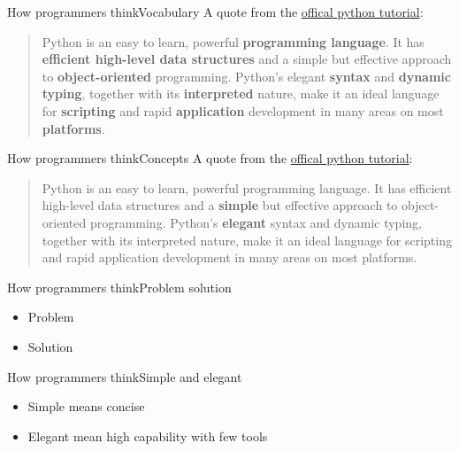 \documentclass[aspectratio=169]{beamer}
\begin{document}
\begin{frame}{How programmers think}{Vocabulary}
A quote from the \href{https://docs.python.org/3/tutorial/index.html}{offical python tutorial}:
\begin{quote}
	Python is an easy to learn, powerful \textbf{programming language}.
	It has \textbf{efficient high-level data structures}
	and a simple but effective approach to \textbf{object-oriented} programming.
	Python’s elegant \textbf{syntax} and \textbf{dynamic typing}, together with its \textbf{interpreted} nature,
	make it an ideal language for \textbf{scripting} and rapid \textbf{application} development in many areas on most \textbf{platforms}.
\end{quote}
\end{frame}

\begin{frame}{How programmers think}{Concepts}
A quote from the \href{https://docs.python.org/3/tutorial/index.html}{offical python tutorial}:
\begin{quote}
	Python is an easy to learn, powerful programming language.
	It has efficient high-level data structures
	and a \textbf{simple} but effective approach to object-oriented programming.
	Python’s \textbf{elegant} syntax and dynamic typing, together with its interpreted nature,
	make it an ideal language for scripting and rapid application development in many areas on most platforms.
\end{quote}
\end{frame}

\begin{frame}{How programmers think}{Problem solution}
\begin{itemize}
	\item Problem
	\item Solution
\end{itemize}
\end{frame}

\begin{frame}{How programmers think}{Simple and elegant}
\begin{itemize}
	\item Simple means concise
	\item Elegant mean high capability with few tools
\end{itemize}
\end{frame}
\end{document}
